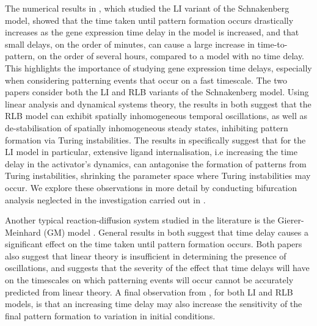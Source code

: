 The numerical results in \cite{gaffmonk}, which studied the LI variant of the Schnakenberg model, showed that the time taken until pattern formation occurs drastically increases as the gene expression time delay in the model is increased, and that small delays, on the order of minutes, can cause a large increase in time-to-pattern, on the order of several hours, compared to a model with no time delay. This highlights the importance of studying gene expression time delays, especially when considering patterning events that occur on a fast timescale. The two papers \cite{jiang, yigaffneyli} consider both the LI and RLB variants of the Schnakenberg model. Using linear analysis and dynamical systems theory, the results in both suggest that the RLB model can exhibit spatially inhomogeneous temporal oscillations, as well as de-stabilisation of spatially inhomogeneous steady states, inhibiting pattern formation via Turing instabilities. The results in \cite{yigaffneyli}  specifically suggest that for the LI model in particular, extensive ligand internalisation, i.e increasing the time delay in the activator's dynamics, can antagonise the formation of patterns from Turing instabilities, shrinking the parameter space where Turing instabilities may occur. We explore these observations in more detail by conducting bifurcation analysis neglected in the investigation carried out in \cite{yigaffneyli}.

Another typical reaction-diffusion system studied in the literature is the Gierer-Meinhard (GM) model \cite{gm}. General results in both \cite{leegaffney,leegaffmonk} suggest that time delay causes a significant effect on the time taken until pattern formation occurs. Both papers also suggest that linear theory is insufficient in determining the presence of oscillations, and \cite{leegaffmonk} suggests that the severity of the effect that time delays will have on the timescales on which patterning events will occur cannot be accurately predicted from linear theory. A final observation from \cite{gaffmonk,leegaffmonk}, for both LI and RLB models, is that an increasing time delay may also increase the sensitivity of the final pattern formation to variation in initial conditions.

